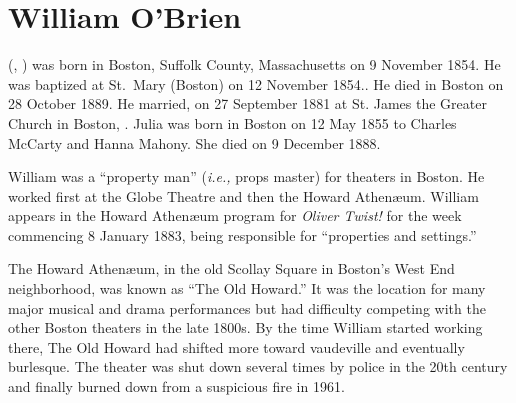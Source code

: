 \section{William O'Brien}

 (, ) was born in Boston, Suffolk County, Massachusetts on 9 November 1854.\cite{William3OBrienBirth} He was baptized at St.\ Mary (Boston) on 12 November 1854.\cite{William3OBrienBaptism}. He died in Boston on 28 October 1889.\cite{William3OBrienDeath} He married, on 27 September 1881 at St. James the Greater Church in Boston, .\cite{William3OBrienMarriage} Julia was born in Boston on 12 May 1855 to Charles McCarty and Hanna Mahony.\cite{JuliaMcCartyBaptism} She died on 9 December 1888.\cite{JuliaMcCartyDeath}

William was a ``property man'' (\textit{i.e.,} props master\cite{PropertyMan}) for theaters in Boston. He worked first at the Globe Theatre\cite{WilliamOBrien1880} and then the Howard Athen\ae um.\cite{WilliamOBrien1883} William appears in the Howard Athen\ae um program for \textit{Oliver Twist!} for the week commencing 8 January 1883, being responsible for ``properties and settings.''\cite{William3OBrienProgram} 

The Howard Athen\ae um, in the old Scollay Square in Boston's West End neighborhood, was known as ``The Old Howard.'' It was the location for many major musical and drama performances but had difficulty competing with the other Boston theaters in the late 1800s. By the time William started working there, The Old Howard had shifted more toward vaudeville and eventually burlesque. The theater was shut down several times by police in the 20th century and finally burned down from a suspicious fire in 1961.\cite{HowardAthenaeum}

